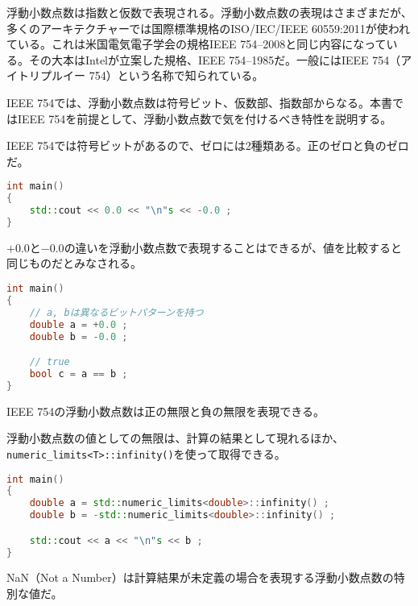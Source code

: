 浮動小数点数は指数と仮数で表現される。浮動小数点数の表現はさまざまだが、多くのアーキテクチャーでは国際標準規格のISO/IEC/IEEE 60559:2011が使われている。これは米国電気電子学会の規格IEEE 754--2008と同じ内容になっている。その大本はIntelが立案した規格、IEEE 754--1985だ。一般にはIEEE 754（アイトリプルイー 754）という名称で知られている。

IEEE 754では、浮動小数点数は符号ビット、仮数部、指数部からなる。本書ではIEEE 754を前提として、浮動小数点数で気を付けるべき特性を説明する。


IEEE 754では符号ビットがあるので、ゼロには2種類ある。正のゼロと負のゼロだ。

\begin{lstlisting}[language={C++}]
int main()
{
    std::cout << 0.0 << "\n"s << -0.0 ;
}
\end{lstlisting}

\(+0.0\)と\(-0.0\)の違いを浮動小数点数で表現することはできるが、値を比較すると同じものだとみなされる。

\begin{lstlisting}[language={C++}]
int main()
{
    // a, bは異なるビットパターンを持つ
    double a = +0.0 ;
    double b = -0.0 ;

    // true
    bool c = a == b ;
}
\end{lstlisting}

\index{+{\(\infty\)}}

IEEE 754の浮動小数点数は正の無限と負の無限を表現できる。

浮動小数点数の値としての無限は、計算の結果として現れるほか、\texttt{numeric\_limits<T>::infinity()}を使って取得できる。

\ifTombow\pagebreak\fi
\begin{lstlisting}[language={C++}]
int main()
{
    double a = std::numeric_limits<double>::infinity() ;
    double b = -std::numeric_limits<double>::infinity() ;

    std::cout << a << "\n"s << b ;
}
\end{lstlisting}


NaN（Not a Number）は計算結果が未定義の場合を表現する浮動小数点数の特別な値だ。

